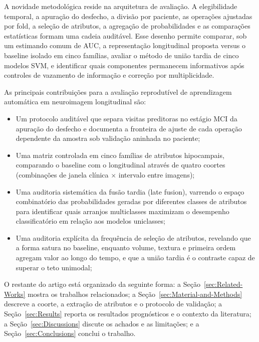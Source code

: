 \documentclass[review]{elsarticle}
\begin{document}
A novidade metodológica reside na arquitetura de avaliação. A elegibilidade temporal, a apuração do desfecho, a divisão por paciente, as operações ajustadas por fold, a seleção de atributos, a agregação de probabilidades e as comparações estatísticas formam uma cadeia auditável. Esse desenho permite comparar, sob um estimando comum de AUC, a representação longitudinal proposta versus o baseline isolado em cinco famílias, avaliar o método de união tardia de cinco modelos SVM, e identificar quais componentes permanecem informativos após controles de vazamento de informação e correção por multiplicidade.

As principais contribuições para a avaliação reprodutível de aprendizagem automática em neuroimagem longitudinal são:
\begin{itemize}
	\item Um protocolo auditável que separa visitas preditoras no estágio MCI da apuração do desfecho e documenta a fronteira de ajuste de cada operação dependente da amostra sob validação aninhada no paciente;
	
	\item Uma matriz controlada em cinco famílias de atributos hipocampais, comparando o baseline com o longitudinal através de quatro coortes (combinações de janela clínica $\times$ intervalo entre imagens);
	
	\item Uma auditoria sistemática da fusão tardia (late fusion), varrendo o espaço combinatório das probabilidades geradas por diferentes classes de atributos para identificar quais arranjos multiclasses maximizam o desempenho classificatório em relação aos modelos uniclasses;

	\item Uma auditoria explícita da frequência de seleção de atributos, revelando que a forma satura no baseline, enquanto volume, textura e primeira ordem agregam valor ao longo do tempo, e que a união tardia é o contraste capaz de superar o teto unimodal;
\end{itemize}

O restante do artigo está organizado da seguinte forma: a Seção~\ref{sec:Related-Works} mostra os trabalhos relacionados; a Seção~\ref{sec:Material-and-Methods} descreve a coorte, a extração de atributos e o protocolo de validação; a Seção~\ref{sec:Results} reporta os resultados prognósticos e o contexto da literatura; a Seção~\ref{sec:Discussions} discute os achados e as limitações; e a Seção~\ref{sec:Conclusions} conclui o trabalho.
\end{document}

